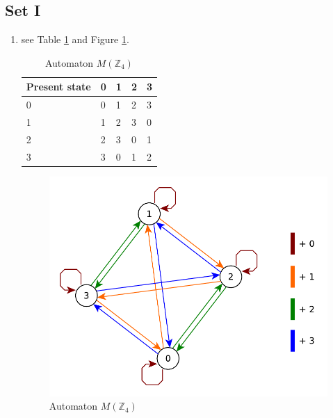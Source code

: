 \documentclass{article}
\begin{document}
\subsection{Set I}
\begin{enumerate}
    \item see Table \ref{tab:automaton-mz4} and Figure \ref{fig:automaton-mz4}.
    
    \begin{table}[]
        \centering
        \begin{tabular}{l|llll}
        Present state & 0 & 1 & 2 & 3 \\ \hline
        0             & 0 & 1 & 2 & 3 \\
        1             & 1 & 2 & 3 & 0 \\
        2             & 2 & 3 & 0 & 1 \\
        3             & 3 & 0 & 1 & 2
        \end{tabular}
        \caption{Automaton $M(\mathbb{Z}_4)$}
        \label{tab:automaton-mz4}
    \end{table}
    \begin{figure}
        \centering
        \includegraphics[scale=0.5]{diagrams/automaton-mz4.pdf}
        \caption{Automaton $M(\mathbb{Z}_4)$}
        \label{fig:automaton-mz4}        
    \end{figure}


\end{enumerate}
\end{document}
